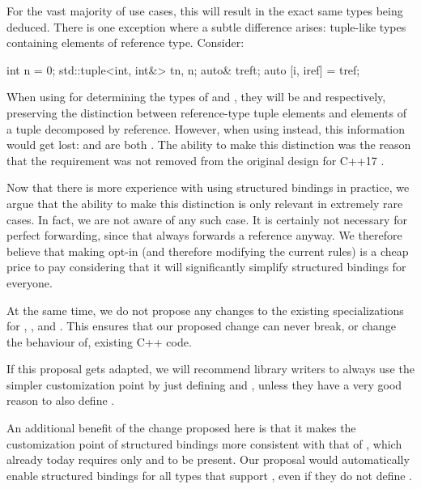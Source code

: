 For the vast majority of use cases, this will result in the exact same types being deduced. There is one exception where a subtle difference arises: tuple-like types containing elements of reference type. Consider:

\begin{codeblock}
int n = 0;
std::tuple<int, int&> t{n, n};
auto& tref{t};
auto [i, iref] = tref;
\end{codeblock}

When using  for determining the types of  and , they will be  and  respectively, preserving the distinction between reference-type tuple elements and elements of a tuple decomposed by reference. However, when using  instead, this information would get lost:  and  are both . The ability to make this distinction was the reason that the  requirement was not removed from the original design for C++17 \cite{P0144R2}.

Now that there is more experience with using structured bindings in practice, we argue that the ability to make this distinction is only relevant in extremely rare cases. In fact, we are not aware of any such case. It is certainly not necessary for perfect forwarding, since that always forwards a reference anyway. We therefore believe that making  opt-in (and therefore modifying the current rules) is a cheap price to pay considering that it will significantly simplify structured bindings for everyone.

At the same time, we do not propose any changes to the existing  specializations for , , and . This ensures that our proposed change can never break, or change the behaviour of, existing C++ code.

If this proposal gets adapted, we will recommend library writers to always use the simpler customization point by just defining  and , unless they have a very good reason to also define . 

An additional benefit of the change proposed here is that it makes the customization point of structured bindings more consistent with that of , which already today requires only  and  to be present. Our proposal would automatically enable structured bindings for all types that support , even if they do not define .

